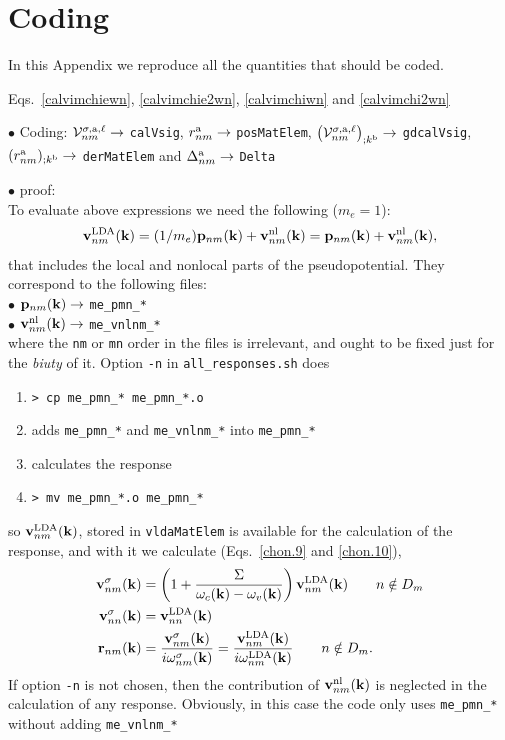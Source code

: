 \section{Coding}\label{code}
In this Appendix we reproduce all the quantities  that should be coded.

Eqs.~\eqref{calvimchiewn}, \eqref{calvimchie2wn}, \eqref{calvimchiwn}
 and \eqref{calvimchi2wn}

\noindent$\bullet$ Coding:
${\mathbf{\cal V}}^{\sigma,\mathrm{a},\ell}_{nm}\to$ \verb=calVsig=,
$r^{\mathrm{a}}_{nm}\to$ \verb=posMatElem=,
$\left({\mathbf{\cal V}}^{\sigma,\mathrm{a},\ell}_{nm}\right)_{;k^{\mathrm{b}}}\to$ \verb=gdcalVsig=,
\\ $(r^{\mathrm{a}}_{nm})_{;k^{\mathrm{b}}}\to$ \verb=derMatElem= and
$\Delta^{\mathrm{a}}_{nm}\to$ \verb=Delta=

$\bullet$ proof:\\
To evaluate above expressions we need the following ($m_e=1$):
\begin{align}\label{}
\mathbf{v}^{\mathrm{LDA}}_{nm}(\mathbf{k}) 
=(1/m_e)\mathbf{p}_{nm}(\mathbf{k})+\mathbf{v}^{\mathrm{nl}}_{nm}(\mathbf{k})
=\mathbf{p}_{nm}(\mathbf{k})+\mathbf{v}^{\mathrm{nl}}_{nm}(\mathbf{k})
,
\end{align}
that
 includes the local and nonlocal parts of the pseudopotential. They
 correspond to the following files:\\
$\bullet$ $\mathbf{p}_{nm}(\mathbf{k})\to$ \verb=me_pmn_*=\\
$\bullet$ $\mathbf{v}^{\mathrm{nl}}_{nm}(\mathbf{k})\to$ \verb=me_vnlnm_*=\\
where the \verb=nm= or \verb=mn= order in the files is irrelevant, and
ought to be fixed just for the {\it biuty} of it.
Option \verb=-n= in \verb=all_responses.sh= does
\begin{enumerate}
\item 
 \verb=> cp me_pmn_* me_pmn_*.o= 
\item adds \verb=me_pmn_*= and \verb=me_vnlnm_*= into
  \verb=me_pmn_*= 
\item calculates the response
\item \verb=> mv me_pmn_*.o me_pmn_*=
\end{enumerate}
so   
$\mathbf{v}^{\mathrm{LDA}}_{nm}(\mathbf{k})$, stored in \verb=vldaMatElem=
is available for the calculation of the response, and with it we calculate
(Eqs.~\eqref{chon.9} and \eqref{chon.10}),
\begin{align}\label{c-chon.98}
\mathbf{v}^\sigma_{nm}(\mathbf{k})
&=
\left(1+\frac{\Sigma}{\omega_c(\mathbf{k})-\omega_v(\mathbf{k})}\right)\mathbf{v}^{\mathrm{LDA}}_{nm}(\mathbf{k})
\quad\quad n\notin D_m
\nonumber\\
\mathbf{v}^\sigma_{nn}(\mathbf{k})
&=
\mathbf{v}^{\mathrm{LDA}}_{nn}(\mathbf{k})
\nonumber\\
\mathbf{r}_{nm}(\mathbf{k})&=\frac{\mathbf{v}^\sigma_{nm}(\mathbf{k})}{i\omega^\sigma_{nm}(\mathbf{k})}
=\frac{\mathbf{v}^{\mathrm{LDA}}_{nm}(\mathbf{k})}{i\omega^{\mathrm{LDA}}_{nm}(\mathbf{k})}
\quad\quad n\notin D_m
.
\end{align}   
If option \verb=-n= is not chosen, then the contribution of $\mathbf{v}^{\mathrm{nl}}_{nm}(\mathbf{k})$
is neglected in the calculation of any response. Obviously, in this
case the code only uses \verb=me_pmn_*= without adding \verb=me_vnlnm_*= 

